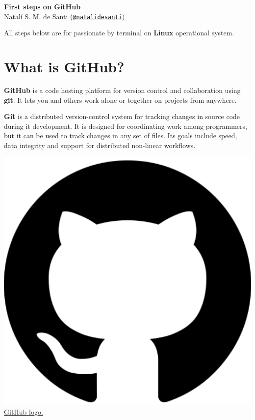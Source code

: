 \documentclass[12pt,a4paper,titlepage,brazil]{article}
\begin{document}
\begin{center}
 \huge{\textbf{First steps on GitHub}}\\
 \large{Natalí S. M. de Santi (\href{https://github.com/natalidesanti}{\texttt{@natalidesanti}})}
\end{center}

All steps below are for passionate by terminal on {\bf Linux} operational system.


\section{What is GitHub?}

\begin{minipage}{0.7\textwidth}
{\bf GitHub} is a code hosting platform for version control and collaboration using {\bf git}. It lets you and others work alone or together on projects from anywhere.

{\bf Git} is a distributed version-control system for tracking changes in source code during it development. It is designed for coordinating work among programmers, but it can be used to track changes in any set of files. Its goals include speed, data integrity and support for distributed non-linear workflows.\\
\end{minipage}
\begin{minipage}{0.3\textwidth}
 \vspace{-0.5cm}
 \centering    
 \includegraphics[scale=0.22]{github-logo.png}\\
\href{https://www.flaticon.com/authors/dave-gandy}{GitHub logo.}
\end{minipage}
\end{document}
